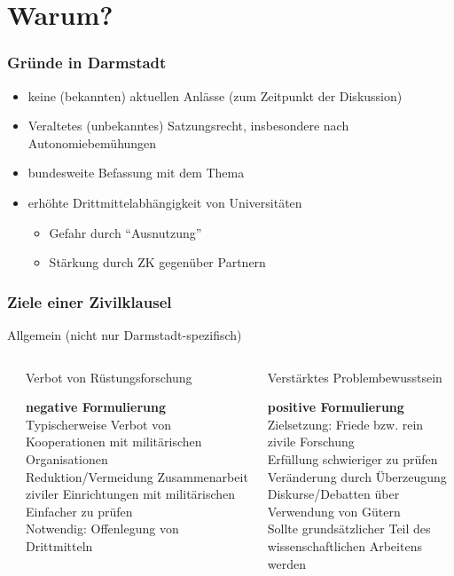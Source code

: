 \documentclass[presentation]{beamer}
\providecommand{\alert}[1]{\textbf{#1}}
\begin{document}
\section{Warum?}
\label{sec-3}
\begin{frame}
\frametitle{Gründe in Darmstadt}
\label{sec-3-1}


\begin{itemize}
\item keine (bekannten) aktuellen Anlässe (zum Zeitpunkt der Diskussion)
\item Veraltetes (unbekanntes) Satzungsrecht, insbesondere nach Autonomiebemühungen
\item bundesweite Befassung mit dem Thema
\item erhöhte Drittmittelabhängigkeit von Universitäten
\begin{itemize}
\item Gefahr durch ``Ausnutzung''
\item Stärkung durch ZK gegenüber Partnern
\end{itemize}
\end{itemize}
\end{frame}
\begin{frame}
\frametitle{Ziele einer Zivilklausel}
\label{sec-3-2}


Allgemein (nicht nur Darmstadt-spezifisch)
\begin{columns}[t] %
\label{sec-3-2-1}
\begin{column}{0.48\textwidth}
\begin{alertblock}{Verbot von Rüstungsforschung}
\label{sec-3-2-1-1}

\fontsize{10pt}{12}\selectfont
     \alert{negative Formulierung}\\[0.4em]
     Typischerweise Verbot von Kooperationen mit militärischen Organisationen\\[0.4em]
     Reduktion/Vermeidung Zusammenarbeit ziviler Einrichtungen mit militärischen\\[0.4em]
     Einfacher zu prüfen\\[0.4em]
     Notwendig: Offenlegung von Drittmitteln
\end{alertblock}
\end{column}
\begin{column}{0.48\textwidth}
\begin{exampleblock}{Verstärktes Problembewusstsein}
\label{sec-3-2-1-2}

\fontsize{10pt}{12}\selectfont
     \alert{positive Formulierung}\\[0.4em]
     Zielsetzung: Friede bzw. rein zivile Forschung\\[0.4em]
     Erfüllung schwieriger zu prüfen\\[0.4em]
     Veränderung durch Überzeugung\\[0.4em]
     Diskurse/Debatten über Verwendung von Gütern\\[0.4em]
     Sollte grundsätzlicher Teil des wissenschaftlichen Arbeitens werden
\end{exampleblock}
\end{column}
\end{columns}
\end{frame}
\end{document}
